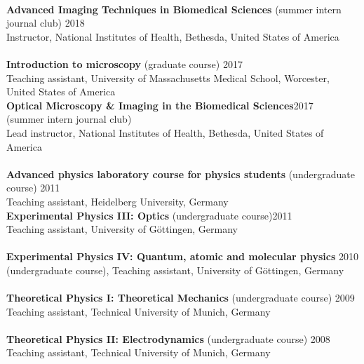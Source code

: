 \documentclass[margin,line]{res}
\begin{document}
\begin{resume}
\vspace*{-3mm}\\
{\bf Advanced Imaging Techniques in Biomedical Sciences} (summer intern journal club) \hfill {2018}\\
Instructor, National Institutes of Health, Bethesda, United States of America \\
\vspace*{-3mm}\\
{\bf Introduction to microscopy} (graduate course) \hfill {2017}\\
Teaching assistant, University of Massachusetts Medical School, Worcester, \\
United States of America\\
{\bf Optical Microscopy \& Imaging in the Biomedical Sciences}\hfill {2017}\\
 (summer intern journal club) \\
 Lead instructor, National Institutes of Health, Bethesda, United States of America \\
\vspace*{-3mm}\\
{\bf Advanced physics laboratory course for physics students} (undergraduate course) \hfill {2011}\\
Teaching assistant, Heidelberg University, Germany\\
{\bf Experimental Physics III: Optics}  (undergraduate course)\hfill {2011}\\
Teaching assistant, University of Göttingen, Germany \\
\vspace*{-3mm}\\
{\bf Experimental Physics IV: Quantum, atomic and molecular physics}  \hfill {2010}\\
(undergraduate course), Teaching assistant, University of Göttingen, Germany\\
\vspace*{-3mm}\\
{\bf Theoretical Physics I: Theoretical Mechanics} (undergraduate course) \hfill {2009}\\
Teaching assistant, Technical University of Munich, Germany\\
\vspace*{-3mm}\\
{\bf Theoretical Physics II: Electrodynamics} (undergraduate course) \hfill {2008}\\
Teaching assistant, Technical University of Munich, Germany\\



\end{resume}
\end{document}
